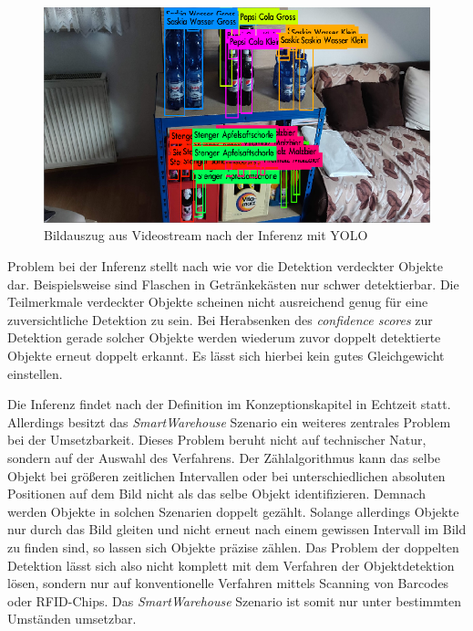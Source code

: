 \begin{figure}[H]
	\begin{center}
		\includegraphics[width=13cm]{Bilder/yolo_inference.png} 
		\caption{Bildauszug aus Videostream nach der Inferenz mit YOLO}
		\label{yolo_inference}
	\end{center}
\end{figure}

Problem bei der Inferenz stellt nach wie vor die Detektion verdeckter Objekte dar. Beispielsweise sind Flaschen in Getränkekästen nur schwer detektierbar. Die Teilmerkmale verdeckter Objekte scheinen nicht ausreichend genug für eine zuversichtliche Detektion zu sein. Bei Herabsenken des \textit{confidence scores} zur Detektion gerade solcher Objekte werden wiederum zuvor doppelt detektierte Objekte erneut doppelt erkannt. Es lässt sich hierbei kein gutes Gleichgewicht einstellen. 

Die Inferenz findet nach der Definition im Konzeptionskapitel in Echtzeit statt. Allerdings besitzt das \textit{SmartWarehouse} Szenario ein weiteres zentrales Problem bei der Umsetzbarkeit. Dieses Problem beruht nicht auf technischer Natur, sondern auf der Auswahl des Verfahrens. Der Zählalgorithmus kann das selbe Objekt bei größeren zeitlichen Intervallen oder bei unterschiedlichen absoluten Positionen auf dem Bild nicht als das selbe Objekt identifizieren. Demnach werden Objekte in solchen Szenarien doppelt gezählt. Solange allerdings Objekte nur durch das Bild \glqq gleiten\grqq{} und nicht erneut nach einem gewissen Intervall im Bild zu finden sind, so lassen sich Objekte präzise zählen. Das Problem der doppelten Detektion lässt sich also nicht komplett mit dem Verfahren der Objektdetektion lösen, sondern nur auf konventionelle Verfahren mittels Scanning von Barcodes oder RFID-Chips. Das \textit{SmartWarehouse} Szenario ist somit nur unter bestimmten Umständen umsetzbar. 
